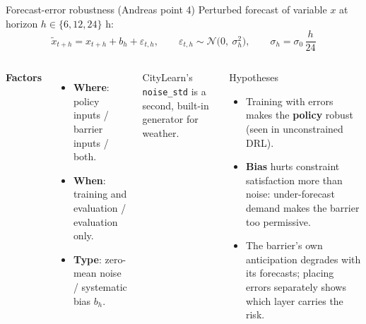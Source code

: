 \documentclass[aspectratio=169,10pt]{beamer}
\begin{document}
\begin{frame}{Forecast-error robustness (Andreas point 4)}
Perturbed forecast of variable $x$ at horizon $h \in \{6, 12, 24\}$ h:
\[
\tilde x_{t+h} = x_{t+h} + b_h + \varepsilon_{t,h}, \qquad \varepsilon_{t,h} \sim \mathcal N\big(0,\ \sigma_h^2\big), \qquad \sigma_h = \sigma_0\,\frac{h}{24}
\]
\begin{columns}[T]
\textbf{Factors}
\begin{itemize}
  \item \textbf{Where}: policy inputs / barrier inputs / both.
  \item \textbf{When}: training and evaluation / evaluation only.
  \item \textbf{Type}: zero-mean noise / systematic bias $b_h$.
\end{itemize}
CityLearn's \texttt{noise\_std} is a second, built-in generator for weather.
\begin{block}{Hypotheses}
\begin{itemize}
  \item Training with errors makes the \textbf{policy} robust (seen in unconstrained DRL).
  \item \textbf{Bias} hurts constraint satisfaction more than noise: under-forecast demand makes the barrier too permissive.
  \item The barrier's own anticipation degrades with its forecasts; placing errors separately shows which layer carries the risk.
\end{itemize}
\end{block}
\end{columns}
\end{frame}
\end{document}
